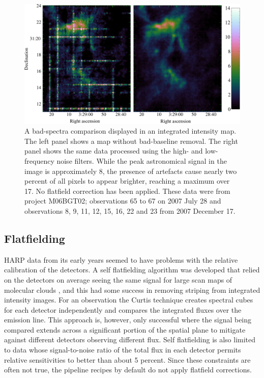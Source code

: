 \documentclass[a4paper,fleqn,usenatbib]{mnras}
\begin{document}
\begin{figure}
\includegraphics[width=\textwidth]{NGC1333_badbaseline_removal}
\caption{A bad-spectra comparison displayed in an integrated intensity map.
  The left panel shows a map without bad-baseline removal.  The right
  panel shows the same data processed using the high- and
  low-frequency noise filters.  While the peak astronomical signal in
  the image is approximately 8, the presence of artefacts cause nearly
  two percent of all pixels to appear brighter, reaching a maximum over 17.
  No flatfield correction has been applied. These data were from
  project M06BGT02; observations 65 to 67 on 2007 July 28 and
  observations 8, 9, 11, 12, 15, 16, 22 and 23 from 2007 December 17.}
\label{fig:badbase:results}
\end{figure}

\subsection{Flatfielding}
\label{sec:flat}

HARP data from its early years seemed to have problems with the
relative calibration of the detectors.  A self flatfielding algorithm
was developed that relied on the detectors on average seeing the same
signal for large scan maps of molecular clouds
\citep{2010MNRAS.401..455C}, and this had some success in removing
striping from integrated intensity images.  For an observation the
Curtis technique creates spectral cubes for each detector
independently and compares the integrated fluxes over the emission
line.  This approach is, however, only successful where the signal
being compared extends across a significant portion of the spatial
plane to mitigate against different detectors observing different
flux.  Self flatfielding is also limited to data whose signal-to-noise
ratio of the total flux in each detector permits relative
sensitivities to better than about 5 percent.  Since these constraints
are often not true, the pipeline recipes by default do not apply
flatfield corrections.
\end{document}
